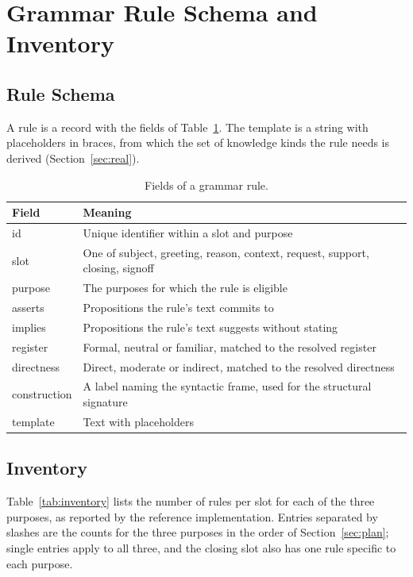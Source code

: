 \documentclass[11pt]{article}
\theoremstyle{definition}
\theoremstyle{remark}
\begin{document}
\appendix

\section{Grammar Rule Schema and Inventory}\label{app:inventory}

\subsection{Rule Schema}

A rule is a record with the fields of Table~\ref{tab:schema}. The template is a string with placeholders in braces, from which the set of knowledge kinds the rule needs is derived (Section~\ref{sec:real}).

\begin{table}[H]
\centering
\caption{Fields of a grammar rule.}\label{tab:schema}
\begin{tabular}{lp{9.5cm}}
\toprule
Field & Meaning\\
\midrule
id & Unique identifier within a slot and purpose\\
slot & One of subject, greeting, reason, context, request, support, closing, signoff\\
purpose & The purposes for which the rule is eligible\\
asserts & Propositions the rule's text commits to\\
implies & Propositions the rule's text suggests without stating\\
register & Formal, neutral or familiar, matched to the resolved register\\
directness & Direct, moderate or indirect, matched to the resolved directness\\
construction & A label naming the syntactic frame, used for the structural signature\\
template & Text with placeholders\\
\bottomrule
\end{tabular}
\end{table}

\subsection{Inventory}

Table~\ref{tab:inventory} lists the number of rules per slot for each of the three purposes, as reported by the reference implementation. Entries separated by slashes are the counts for the three purposes in the order of Section~\ref{sec:plan}; single entries apply to all three, and the closing slot also has one rule specific to each purpose.
\end{document}
